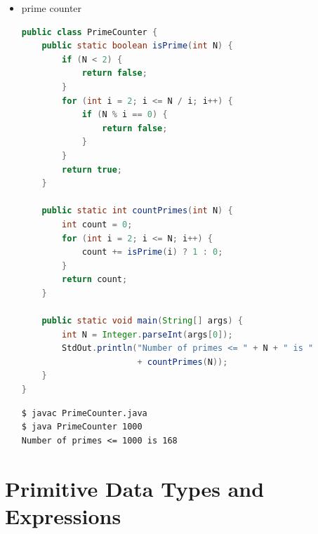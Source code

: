 \documentclass[8pt,a4paper,compress]{beamer}
\begin{document}
\begin{frame}[fragile]
\begin{itemize}
\item prime counter

\begin{lstlisting}[language=Java]
public class PrimeCounter {
    public static boolean isPrime(int N) {
        if (N < 2) {
            return false;
        }
        for (int i = 2; i <= N / i; i++) {
            if (N % i == 0) {
                return false;
            }
        }
        return true;
    }

    public static int countPrimes(int N) {
        int count = 0;
        for (int i = 2; i <= N; i++) {
            count += isPrime(i) ? 1 : 0;
        }
        return count;
    }
    
    public static void main(String[] args) {
        int N = Integer.parseInt(args[0]);
        StdOut.println("Number of primes <= " + N + " is " 
                       + countPrimes(N));
    }
}
\end{lstlisting}

\begin{lstlisting}[language={}]
$ javac PrimeCounter.java
$ java PrimeCounter 1000
Number of primes <= 1000 is 168
\end{lstlisting}
\end{itemize}
\end{frame}

\section{Primitive Data Types and Expressions}
\end{document}
